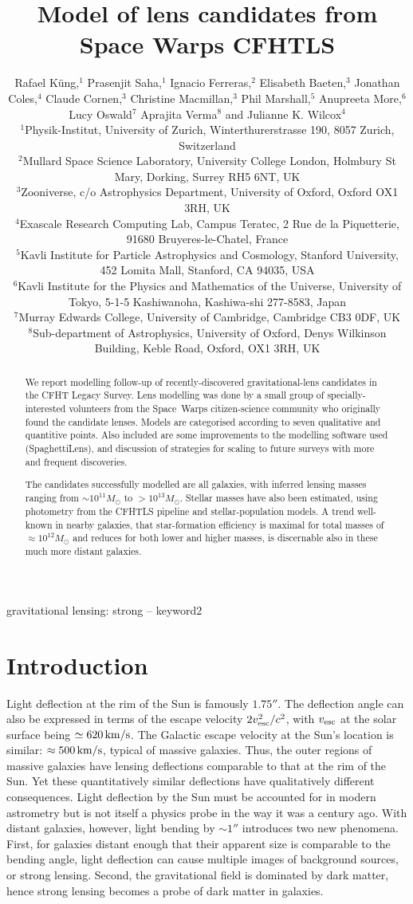 \documentclass[fleqn,usenatbib]{mnras}
\title[Lens models for Space Warps CFHTLS]{Model of lens candidates from
  Space Warps CFHTLS}
\author[K\"ung et al]{Rafael K\"ung,$^{1}$
Prasenjit Saha,$^{1}$
Ignacio Ferreras,$^{2}$
Elisabeth Baeten,$^{3}$
\newauthor
Jonathan Coles,$^{4}$
Claude Cornen,$^{3}$
Christine Macmillan,$^{3}$
Phil Marshall,$^{5}$ 
\newauthor
Anupreeta More,$^{6}$
Lucy Oswald$^{7}$
Aprajita Verma$^{8}$
and Julianne K. Wilcox$^{4}$
%
\\
%
$^{1}$Physik-Institut, University of Zurich, Winterthurerstrasse 190, 8057 Zurich, Switzerland\\
$^{2}$Mullard Space Science Laboratory, University College London, Holmbury St Mary, Dorking, Surrey RH5 6NT, UK\\
$^{3}$Zooniverse, c/o Astrophysics Department, University of Oxford, Oxford OX1 3RH, UK \\
$^{4}$Exascale Research Computing Lab, Campus Teratec, 2 Rue de la Piquetterie, 91680 Bruyeres-le-Chatel, France\\
$^{5}$Kavli Institute for Particle Astrophysics and Cosmology, Stanford University, 452 Lomita Mall, Stanford, CA 94035, USA\\
$^{6}$Kavli Institute for the Physics and Mathematics of the Universe, University of Tokyo, 5-1-5 Kashiwanoha, Kashiwa-shi 277-8583, Japan\\
$^{7}$Murray Edwards College, University of Cambridge, Cambridge CB3 0DF, UK\\
$^{8}$Sub-department of Astrophysics, University of Oxford, Denys Wilkinson Building, Keble Road, Oxford, OX1 3RH, UK\\
}
\begin{document}
\label{firstpage}
\pagerange{\pageref{firstpage}--\pageref{lastpage}}
\maketitle

\begin{abstract}
We report modelling follow-up of recently-discovered
gravitational-lens candidates in the CFHT Legacy Survey.  Lens
modelling was done by a small group of specially-interested volunteers
from the Space~Warps citizen-science community who originally found
the candidate lenses.  Models are categorised according to seven
qualitative and quantitive points.  Also included are some
improvements to the modelling software used (SpaghettiLens),
and discussion of strategies for scaling to future surveys
with more and frequent discoveries.

The candidates successfully modelled are all galaxies, with inferred
lensing masses ranging from $\sim10^{11}M_\odot$ to $>10^{13}M_\odot$.
Stellar masses have also been estimated, using photometry from the
CFHTLS pipeline and stellar-population models.  A trend well-known
in nearby galaxies, that star-formation efficiency is maximal for
total masses of $\approx10^{12}M_\odot$ and reduces for both lower and
higher masses, is discernable also in these much more distant
galaxies.
\end{abstract}

\begin{keywords}
gravitational lensing: strong -- keyword2
\end{keywords}

\section{Introduction}

Light deflection at the rim of the Sun is famously $1.75''$.  The
deflection angle can also be expressed in terms of the escape velocity
$2v_{\rm esc}^2/c^2$, with $v_{\rm esc}$ at the solar surface being
$\simeq620\rm\,km/s$.  The Galactic escape velocity at the Sun's
location is similar: $\approx500\rm\,km/s$, typical of massive
galaxies.  Thus, the outer regions of massive galaxies have lensing
deflections comparable to that at the rim of the Sun.  Yet these
quantitatively similar deflections have qualitatively different
consequences.  Light deflection by the Sun must be accounted for in
modern astrometry \citep[see e.g.,][]{2015CQGra..32p5008C} but is not
itself a physics probe in the way it was a century ago.  With distant
galaxies, however, light bending by $\sim1''$ introduces two new
phenomena.  First, for galaxies distant enough that their apparent
size is comparable to the bending angle, light deflection can cause
multiple images of background sources, or strong lensing.  Second, the
gravitational field is dominated by dark matter, hence strong lensing
becomes a probe of dark matter in galaxies.
\end{document}
